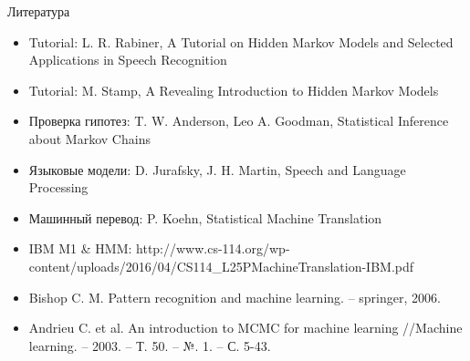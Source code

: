 \begin{frame}{Литература}
\begin{itemize}
\item Tutorial: L. R. Rabiner, A Tutorial on Hidden Markov Models and Selected Applications in Speech Recognition
\item Tutorial: M. Stamp, A Revealing Introduction to Hidden Markov Models
\item Проверка гипотез: T. W. Anderson, Leo A. Goodman, Statistical Inference about Markov Chains
\item Языковые модели: D. Jurafsky, J. H. Martin, Speech and Language Processing
\item Машинный перевод:  P. Koehn, Statistical Machine Translation
\item IBM M1 \& HMM: http://www.cs-114.org/wp-content/uploads/2016/04/CS114\_L25PMachineTranslation-IBM.pdf
\item Bishop C. M. Pattern recognition and machine learning. – springer, 2006.
\item Andrieu C. et al. An introduction to MCMC for machine learning //Machine learning. – 2003. – Т. 50. – №. 1. – С. 5-43.
\end{itemize}
\end{frame}


